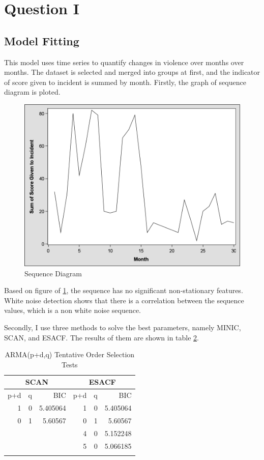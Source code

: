 \section*{Question I}
\subsection*{Model Fitting}
This model uses time series to quantify changes in violence over months over months. The dataset is selected and merged into groups at first, and the indicator of score given to incident is summed by month. Firstly, the graph of sequence diagram is ploted.

\begin{figure}[H]
	\centering
		\includegraphics[scale=0.25]{Pic/Q1/1.png}
	\caption{Sequence Diagram}
	\label{f1}
\end{figure}

Based on figure of \ref{f1}, the sequence has no significant non-stationary features. White noise detection shows that there is a correlation between the sequence values, which is a non white noise sequence.

Secondly, I use three methods to solve the best parameters, namely MINIC, SCAN, and ESACF. The results of them are shown in table \ref{t1}.

\begin{table}[H]
	\centering

\begin{longtable}{rrrrrr}
\toprule
	\multicolumn{3}{c}{SCAN} &    \multicolumn{3}{c}{ESACF}\\
	\midrule
    p+d &    q &    BIC &    p+d &    q &    BIC\\
\endhead
    1 &    0 &    5.405064 &    1 &    0 &    5.405064\\
    0 &    1 &    5.60567 &    0 &    1 &    5.60567\\
     &      &      &    4 &    0 &    5.152248\\
     &      &      &    5 &    0 &    5.066185\\
\bottomrule

\caption{ARMA(p+d,q) Tentative Order Selection Tests}
\label{t1}
\end{longtable}
\end{table}

